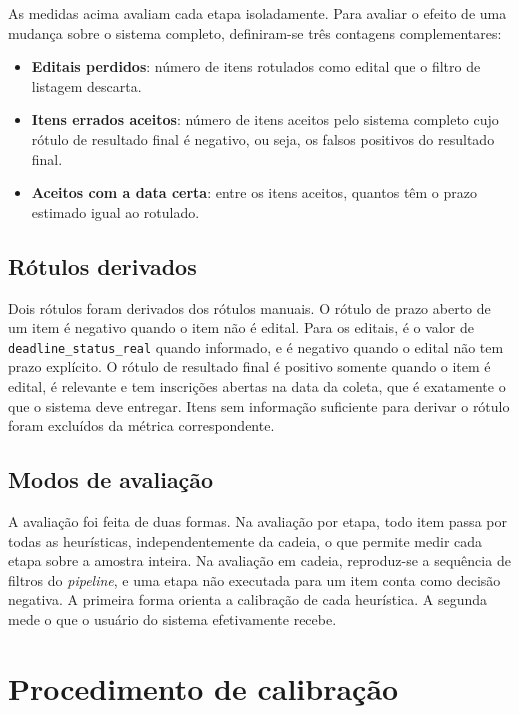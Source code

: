 As medidas acima avaliam cada etapa isoladamente. Para avaliar o efeito de uma
mudança sobre o sistema completo, definiram-se três contagens complementares:

\begin{itemize}
  \item \textbf{Editais perdidos}: número de itens rotulados como edital que o
    filtro de listagem descarta.
  \item \textbf{Itens errados aceitos}: número de itens aceitos pelo sistema
    completo cujo rótulo de resultado final é negativo, ou seja, os falsos
    positivos do resultado final.
  \item \textbf{Aceitos com a data certa}: entre os itens aceitos, quantos têm
    o prazo estimado igual ao rotulado.
\end{itemize}

\subsection{Rótulos derivados}
\label{subsec:derivados}

Dois rótulos foram derivados dos rótulos manuais. O rótulo de prazo aberto de
um item é negativo quando o item não é edital. Para os editais, é o valor de
\texttt{deadline\_status\_real} quando informado, e é negativo quando o edital
não tem prazo explícito. O rótulo de resultado final é positivo somente quando
o item é edital, é relevante e tem inscrições abertas na data da coleta, que é
exatamente o que o sistema deve entregar. Itens sem informação suficiente para
derivar o rótulo foram excluídos da métrica correspondente.

\subsection{Modos de avaliação}
\label{subsec:modos}

A avaliação foi feita de duas formas. Na avaliação por etapa, todo item passa
por todas as heurísticas, independentemente da cadeia, o que permite medir cada
etapa sobre a amostra inteira. Na avaliação em cadeia, reproduz-se a sequência
de filtros do \textit{pipeline}, e uma etapa não executada para um item conta
como decisão negativa. A primeira forma orienta a calibração de cada
heurística. A segunda mede o que o usuário do sistema efetivamente recebe.

\section{Procedimento de calibração}
\label{sec:calibracao}

